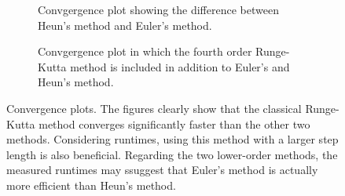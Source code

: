 \documentclass{article}
\begin{document}
\begin{figure}
    \centering
    
\end{figure}

\begin{figure}
    \centering
    
\end{figure}

\begin{figure}
    \centering
    
\end{figure}

\begin{figure}[htbp]
    \centering
    \begin{subfigure}[t]{0.4\textwidth}
            
        \label{fig:convergence_plot}
        \caption{Convgergence plot showing the difference between Heun's method and Euler's method.}
    \end{subfigure}
    \hfill
    \begin{subfigure}[t]{0.4\textwidth}
            
        \label{fig:convergence_plot_all}
        \caption{Convgergence plot in which the fourth order Runge-Kutta method is included in addition to Euler's and Heun's method.}
    \end{subfigure}
    \caption{Convergence plots. The figures clearly show that the classical Runge-Kutta method converges significantly faster than the other two methods. Considering runtimes, using this method with a larger step length is also beneficial. Regarding the two lower-order methods, the measured runtimes may ssuggest that Euler's method is actually more efficient than Heun's method.}
\end{figure}

%    

\begin{figure}
    \centering
    
\end{figure}
\end{document}
